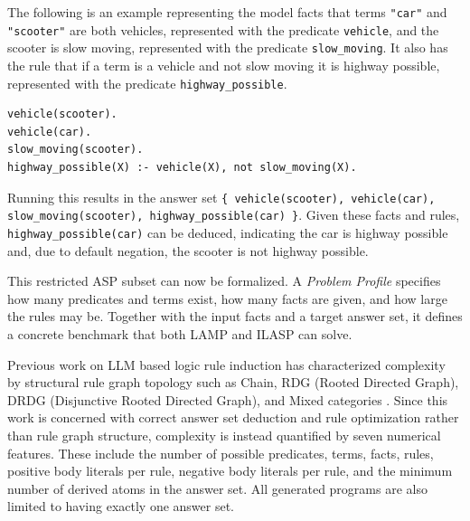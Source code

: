 \documentclass[11pt,a4paper]{article}
\begin{document}
The following is an example representing the model facts that terms \texttt{"car"} and \texttt{"scooter"} are both vehicles, represented with the predicate \texttt{vehicle}, and the scooter is slow moving, represented with the predicate \texttt{slow\_moving}. It also has the rule that if a term is a vehicle and not slow moving it is highway possible, represented with the predicate \texttt{highway\_possible}.

\begin{lstlisting}[language=ASP, caption={Vehicle example ASP program.}]
vehicle(scooter).
vehicle(car).
slow_moving(scooter).
highway_possible(X) :- vehicle(X), not slow_moving(X).
\end{lstlisting}

Running this results in the answer set \texttt{\{ vehicle(scooter), vehicle(car), slow\_moving(scooter), highway\_possible(car) \}}. Given these facts and rules, \texttt{highway\_possible(car)} can be deduced, indicating the car is highway possible and, due to default negation, the scooter is not highway possible.

This restricted ASP subset can now be formalized. A \emph{Problem Profile} specifies how many predicates and terms exist, how many facts are given, and how large the rules may be. Together with the input facts and a target answer set, it defines a concrete benchmark that both LAMP and ILASP can solve.

Previous work on LLM based logic rule induction has characterized complexity by structural rule graph topology such as Chain, RDG (Rooted Directed Graph), DRDG (Disjunctive Rooted Directed Graph), and Mixed categories \cite{gandarela2025inductivelearninglogicaltheories}. Since this work is concerned with correct answer set deduction and rule optimization rather than rule graph structure, complexity is instead quantified by seven numerical features. These include the number of possible predicates, terms, facts, rules, positive body literals per rule, negative body literals per rule, and the minimum number of derived atoms in the answer set. All generated programs are also limited to having exactly one answer set.
\end{document}
